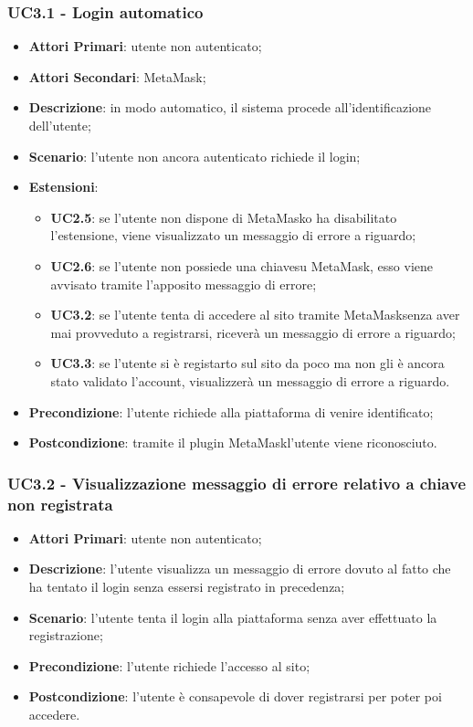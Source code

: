 \subsubsection{UC3.1 - Login automatico}
\begin{itemize}
	\item \textbf{Attori Primari}:
	utente non autenticato;
	\item \textbf{Attori Secondari}:
	MetaMask\glo;
	\item \textbf{Descrizione}:
	in modo automatico, il sistema procede all'identificazione dell'utente;
	\item \textbf{Scenario}:
	l'utente non ancora autenticato richiede il login;
	\item \textbf{Estensioni}:
	\begin{itemize}
		\item \textbf{UC2.5}: se l'utente non dispone di MetaMask\glosp o ha disabilitato l'estensione, viene visualizzato un messaggio di errore a riguardo;
		\item \textbf{UC2.6}: se l'utente non possiede una chiave\glosp su MetaMask\glo, esso viene avvisato tramite l'apposito messaggio di errore;
		\item \textbf{UC3.2}: se l'utente tenta di accedere al sito tramite MetaMask\glosp senza aver mai provveduto a registrarsi, riceverà un messaggio di errore a riguardo;
		\item \textbf{UC3.3}: se l'utente si è registarto sul sito da poco ma non gli è ancora stato validato l'account, visualizzerà un messaggio di errore a riguardo.
	\end{itemize}
	\item \textbf{Precondizione}:
	l'utente richiede alla piattaforma di venire identificato;
	\item \textbf{Postcondizione}:
	tramite il plugin MetaMask\glosp l'utente viene riconosciuto.
\end{itemize}
\subsubsection{UC3.2 - Visualizzazione messaggio di errore relativo a chiave non registrata}
\begin{itemize}
	\item \textbf{Attori Primari}:
	utente non autenticato;
	\item \textbf{Descrizione}:
	l'utente visualizza un messaggio di errore dovuto al fatto che ha tentato il login senza essersi registrato in precedenza;
	\item \textbf{Scenario}:
	l'utente tenta il login alla piattaforma senza aver effettuato la registrazione;
	\item \textbf{Precondizione}:
	l'utente richiede l'accesso al sito;
	\item \textbf{Postcondizione}:
	l'utente è consapevole di dover registrarsi per poter poi accedere.
\end{itemize}
